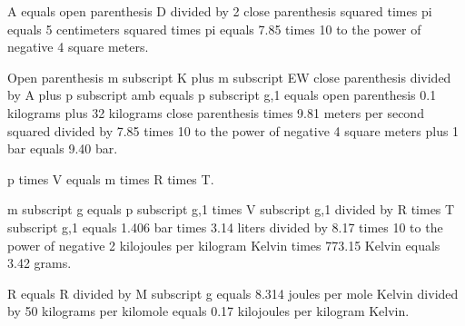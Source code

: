 A equals open parenthesis D divided by 2 close parenthesis squared times pi equals 5 centimeters squared times pi equals 7.85 times 10 to the power of negative 4 square meters.  

Open parenthesis m subscript K plus m subscript EW close parenthesis divided by A plus p subscript amb equals p subscript g,1 equals open parenthesis 0.1 kilograms plus 32 kilograms close parenthesis times 9.81 meters per second squared divided by 7.85 times 10 to the power of negative 4 square meters plus 1 bar equals 9.40 bar.  

p times V equals m times R times T.  

m subscript g equals p subscript g,1 times V subscript g,1 divided by R times T subscript g,1 equals 1.406 bar times 3.14 liters divided by 8.17 times 10 to the power of negative 2 kilojoules per kilogram Kelvin times 773.15 Kelvin equals 3.42 grams.  

R equals R divided by M subscript g equals 8.314 joules per mole Kelvin divided by 50 kilograms per kilomole equals 0.17 kilojoules per kilogram Kelvin.